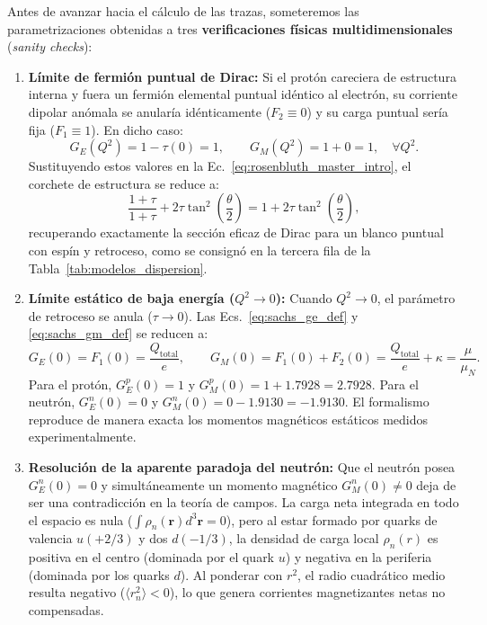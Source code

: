 \documentclass[10pt,a4paper]{article}
\begin{document}
Antes de avanzar hacia el cálculo de las trazas, someteremos las parametrizaciones obtenidas a tres \textbf{verificaciones físicas multidimensionales} (\textit{sanity checks}):
\begin{enumerate}
    \item \textbf{Límite de fermión puntual de Dirac:} Si el protón careciera de estructura interna y fuera un fermión elemental puntual idéntico al electrón, su corriente dipolar anómala se anularía idénticamente ($F_2 \equiv 0$) y su carga puntual sería fija ($F_1 \equiv 1$). En dicho caso:
    \begin{equation}
    G_E(Q^2) = 1 - \tau(0) = 1, \qquad G_M(Q^2) = 1 + 0 = 1, \quad \forall Q^2.
    \end{equation}
    Sustituyendo estos valores en la Ec.~\eqref{eq:rosenbluth_master_intro}, el corchete de estructura se reduce a:
    \begin{equation}
    \frac{1 + \tau}{1+\tau} + 2\tau \tan^2\left(\frac{\theta}{2}\right) = 1 + 2\tau \tan^2\left(\frac{\theta}{2}\right),
    \end{equation}
    recuperando exactamente la sección eficaz de Dirac para un blanco puntual con espín y retroceso, como se consignó en la tercera fila de la Tabla~\ref{tab:modelos_dispersion}.
    \item \textbf{Límite estático de baja energía ($Q^2 \to 0$):} Cuando $Q^2 \to 0$, el parámetro de retroceso se anula ($\tau \to 0$). Las Ecs.~\eqref{eq:sachs_ge_def} y \eqref{eq:sachs_gm_def} se reducen a:
    \begin{equation}
    G_E(0) = F_1(0) = \frac{Q_{\text{total}}}{e}, \qquad G_M(0) = F_1(0) + F_2(0) = \frac{Q_{\text{total}}}{e} + \kappa = \frac{\mu}{\mu_N}.
    \end{equation}
    Para el protón, $G_E^p(0) = 1$ y $G_M^p(0) = 1 + 1.7928 = 2.7928$. Para el neutrón, $G_E^n(0) = 0$ y $G_M^n(0) = 0 - 1.9130 = -1.9130$. El formalismo reproduce de manera exacta los momentos magnéticos estáticos medidos experimentalmente.
    \item \textbf{Resolución de la aparente paradoja del neutrón:} Que el neutrón posea $G_E^n(0) = 0$ y simultáneamente un momento magnético $G_M^n(0) \neq 0$ deja de ser una contradicción en la teoría de campos. La carga neta integrada en todo el espacio es nula ($\int \rho_n(\mathbf{r}) d^3\mathbf{r} = 0$), pero al estar formado por quarks de valencia $u(+2/3)$ y dos $d(-1/3)$, la densidad de carga local $\rho_n(r)$ es positiva en el centro (dominada por el quark $u$) y negativa en la periferia (dominada por los quarks $d$). Al ponderar con $r^2$, el radio cuadrático medio resulta negativo ($\langle r_n^2 \rangle < 0$), lo que genera corrientes magnetizantes netas no compensadas.
\end{enumerate}
\end{document}
